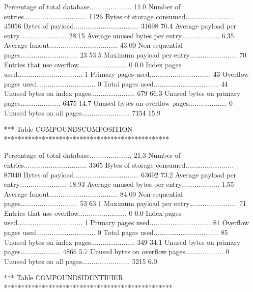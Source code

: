 Percentage of total database......................  11.0%
Number of entries................................. 1126      
Bytes of storage consumed......................... 45056     
Bytes of payload.................................. 31698       70.4%
Average payload per entry......................... 28.15     
Average unused bytes per entry.................... 6.35      
Average fanout.................................... 43.00     
Non-sequential pages.............................. 23          53.5%
Maximum payload per entry......................... 70        
Entries that use overflow......................... 0            0.0%
Index pages used.................................. 1         
Primary pages used................................ 43        
Overflow pages used............................... 0         
Total pages used.................................. 44        
Unused bytes on index pages....................... 679         66.3%
Unused bytes on primary pages..................... 6475        14.7%
Unused bytes on overflow pages.................... 0         
Unused bytes on all pages......................... 7154        15.9%

*** Table COMPOUNDSCOMPOSITION ************************************************

Percentage of total database......................  21.3%
Number of entries................................. 3365      
Bytes of storage consumed......................... 87040     
Bytes of payload.................................. 63692       73.2%
Average payload per entry......................... 18.93     
Average unused bytes per entry.................... 1.55      
Average fanout.................................... 84.00     
Non-sequential pages.............................. 53          63.1%
Maximum payload per entry......................... 71        
Entries that use overflow......................... 0            0.0%
Index pages used.................................. 1         
Primary pages used................................ 84        
Overflow pages used............................... 0         
Total pages used.................................. 85        
Unused bytes on index pages....................... 349         34.1%
Unused bytes on primary pages..................... 4866         5.7%
Unused bytes on overflow pages.................... 0         
Unused bytes on all pages......................... 5215         6.0%

*** Table COMPOUNDSIDENTIFIER *************************************************

